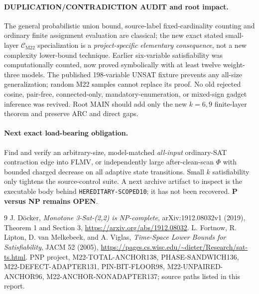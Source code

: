 \documentclass[11pt]{article}
\newcommand{\CM}{\mathcal C_{\mathrm{M22}}}
\begin{document}
\paragraph{DUPLICATION/CONTRADICTION AUDIT and root impact.}
The general probabilistic union bound, source-label fixed-cardinality counting and ordinary finite assignment evaluation are classical; the new exact stated small-layer \(\CM\) specialization is a \emph{project-specific elementary consequence}, not a new complexity lower-bound technique. Earlier six-variable satisfiability was computationally counted, now proved symbolically with at least twelve weight-three models. The published 198-variable UNSAT fixture prevents any all-size generalization; random M22 samples cannot replace its proof. No old rejected cosine, pair-free, connected-only, mandatory-enumeration, or mixed-sign gadget inference was revived. Root MAIN should add only the new \(k=6,9\) finite-layer theorem and preserve ARC and direct gaps.

\paragraph{Next exact load-bearing obligation.}
Find and verify an arbitrary-size, model-matched \emph{all-input} ordinary-SAT contraction edge into FLMV, or independently large after-clean-scan \(\Phi\) with bounded charged decrease on all adaptive state transitions. Small \(k\) satisfiability only tightens the source-control suite. A next archive artifact to inspect is the executable body behind \texttt{HEREDITARY-SCOPED10}; it has not been recovered. \textbf{P versus NP remains OPEN}.
\begin{thebibliography}{9}
 J. D\"ocker, \emph{Monotone 3-Sat-(2,2) is NP-complete}, arXiv:1912.08032v1 (2019), Theorem 1 and Section 3, \url{https://arxiv.org/abs/1912.08032}.
 L. Fortnow, R. Lipton, D. van Melkebeek, and A. Viglas, \emph{Time-Space Lower Bounds for Satisfiability}, JACM 52 (2005), \url{https://pages.cs.wisc.edu/~dieter/Research/sat-ts.html}.
 PNP project, M22-TOTAL-ANCHOR138, PHASE-SANDWICH136, M22-DEFECT-ADAPTER131, PIN-BIT-FLOOR98, M22-UNPAIRED-ANCHOR96, M22-ANCHOR-NONADAPTER137; source paths listed in this report.
\end{thebibliography}
\end{document}
